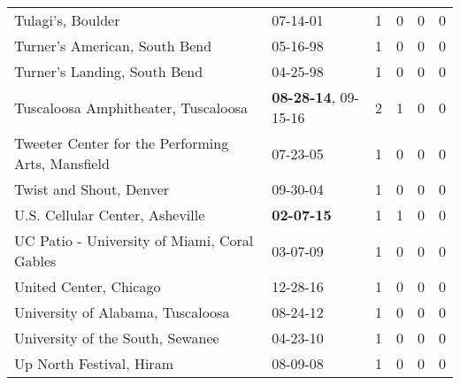 \begin{longtable}{p{}p{}p{}p{}p{}p{}}
                                                            Tulagi's, Boulder &                                                07-14-01\textsuperscript{} &  1 &  0 &  0 &  0 \\
                                                Turner's American, South Bend &                                                05-16-98\textsuperscript{} &  1 &  0 &  0 &  0 \\
                                                 Turner's Landing, South Bend &                                                04-25-98\textsuperscript{} &  1 &  0 &  0 &  0 \\
                                          Tuscaloosa Amphitheater, Tuscaloosa &           \textbf{08-28-14\textsuperscript{}}, 09-15-16\textsuperscript{} &  2 &  1 &  0 &  0 \\
                            Tweeter Center for the Performing Arts, Mansfield &                                                07-23-05\textsuperscript{} &  1 &  0 &  0 &  0 \\
                                                      Twist and Shout, Denver &                                                09-30-04\textsuperscript{} &  1 &  0 &  0 &  0 \\
                                              U.S. Cellular Center, Asheville &                                       \textbf{02-07-15\textsuperscript{}} &  1 &  1 &  0 &  0 \\
                                 UC Patio - University of Miami, Coral Gables &                                                03-07-09\textsuperscript{} &  1 &  0 &  0 &  0 \\
                                                       United Center, Chicago &                                                12-28-16\textsuperscript{} &  1 &  0 &  0 &  0 \\
                                            University of Alabama, Tuscaloosa &                                                08-24-12\textsuperscript{} &  1 &  0 &  0 &  0 \\
                                             University of the South, Sewanee &                                                04-23-10\textsuperscript{} &  1 &  0 &  0 &  0 \\
                                                     Up North Festival, Hiram &                                                08-09-08\textsuperscript{} &  1 &  0 &  0 &  0 \\

\end{longtable}
